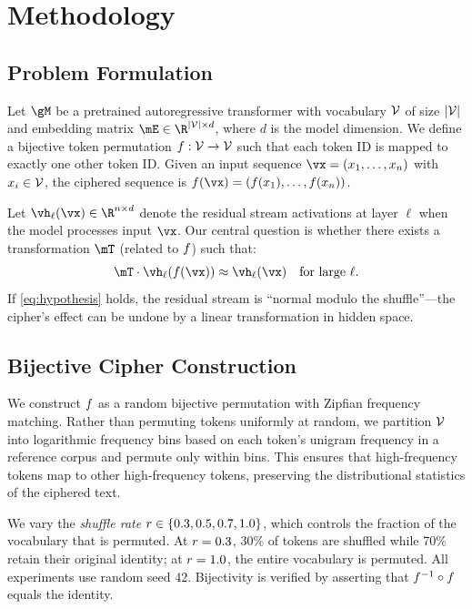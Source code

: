\section{Methodology}
\label{sec:method}

\subsection{Problem Formulation}
\label{sec:formulation}

Let $\gM$ be a pretrained autoregressive transformer with vocabulary $\mathcal{V}$ of size $|\mathcal{V}|$ and embedding matrix $\embmat \in \R^{|\vocab| \times d}$, where $d$ is the model dimension. We define a bijective token permutation $f: \mathcal{V} \to \mathcal{V}$ such that each token ID is mapped to exactly one other token ID. Given an input sequence $\vx = (x_1, \ldots, x_n)$ with $x_i \in \mathcal{V}$, the ciphered sequence is $\perm(\vx) = (\perm(x_1), \ldots, \perm(x_n))$.

Let $\vh_\ell(\vx) \in \R^{n \times d}$ denote the residual stream activations at layer $\ell$ when the model processes input $\vx$. Our central question is whether there exists a transformation $\permmat$ (related to $f$) such that:
\begin{equation}
\label{eq:hypothesis}
\permmat \cdot \vh_\ell(\perm(\vx)) \approx \vh_\ell(\vx) \quad \text{for large } \ell.
\end{equation}
If \eqref{eq:hypothesis} holds, the residual stream is ``normal modulo the shuffle''---the cipher's effect can be undone by a linear transformation in hidden space.

\subsection{Bijective Cipher Construction}
\label{sec:cipher}

We construct $f$ as a random bijective permutation with Zipfian frequency matching. Rather than permuting tokens uniformly at random, we partition $\mathcal{V}$ into logarithmic frequency bins based on each token's unigram frequency in a reference corpus and permute only within bins. This ensures that high-frequency tokens map to other high-frequency tokens, preserving the distributional statistics of the ciphered text.

We vary the \emph{shuffle rate} $r \in \{0.3, 0.5, 0.7, 1.0\}$, which controls the fraction of the vocabulary that is permuted. At $r = 0.3$, 30\% of tokens are shuffled while 70\% retain their original identity; at $r = 1.0$, the entire vocabulary is permuted. All experiments use random seed 42. Bijectivity is verified by asserting that $f^{-1} \circ f$ equals the identity.

